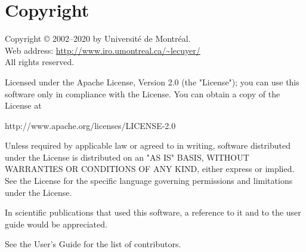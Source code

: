 \section*{Copyright}
 

Copyright \copyright {} 2002--2020 by Universit\'e de Montr\'eal.\\
  Web address:   \url{http://www.iro.umontreal.ca/~lecuyer/} \\
  All rights reserved.

Licensed under the Apache License, Version 2.0 (the "License"); 
you can use this software only in compliance with the License. 
You can obtain a copy of the License at

http://www.apache.org/licenses/LICENSE-2.0

Unless required by applicable law or agreed to in writing, software distributed under the License is distributed on an "AS IS" BASIS, WITHOUT WARRANTIES OR CONDITIONS OF ANY KIND, either express or implied. See the License for the specific language governing permissions and limitations under the License.

In scientific publications that used this software, a reference to it and to the user guide would be appreciated.

See the User's Guide for the list of contributors.